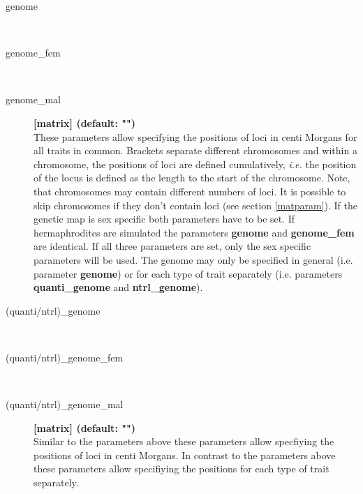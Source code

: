 \documentclass[letterpaper,12pt,oneside]{book}
\begin{document}
\begin{description}
\item[genome]\hspace*{\fill}\\
\vspace{-9mm}
\item[genome\_fem]\hspace*{\fill}\\
\vspace{-9mm}
\item[genome\_mal]\textbf{[matrix] (default: "")}\\
These parameters allow specifying the positions of loci in centi Morgans for all traits in common.
Brackets separate different chromosomes and within a chromosome, the positions of loci are defined cumulatively, \textit{i.e.} the position of the locus is defined as the length to the start of the chromosome. Note, that
chromosomes may contain different numbers of loci. It is possible to skip chromosomes if they don't
contain loci (see section \ref{matparam}). If the genetic map is sex specific both parameters have
to be set. If hermaphrodites are simulated the parameters \textbf{genome} and \textbf{genome\_fem} are identical.
If all three parameters are set, only the sex specific parameters will be used. The genome may only
be specified in general (i.e. parameter \textbf{genome}) or for each type of trait separately (i.e.
parameters \textbf{quanti\_genome} and \textbf{ntrl\_genome}).\\


\item[(quanti/ntrl)\_genome]\hspace*{\fill}\\
\vspace{-9mm}
\item[(quanti/ntrl)\_genome\_fem]\hspace*{\fill}\\
\vspace{-9mm}
\item[(quanti/ntrl)\_genome\_mal]\textbf{[matrix] (default: "")}\\
Similar to the parameters above these parameters allow specfiying the positions of loci in centi
Morgans. In contrast to the parameters above these parameters allow specifiying the positions for
each type of trait separately.\\


\end{description}
\end{document}
